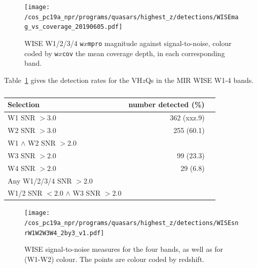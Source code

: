 \documentclass[usenatbib]{mnras}
\begin{document}

\begin{figure}
  \texttt{[image: /cos\_pc19a\_npr/programs/quasars/highest\_z/detections/WISEmag\_vs\_coverage\_20190605.pdf]}
  \centering
  \vspace{-14pt}
  \caption[]{WISE W1/2/3/4 {\tt w$x$mpro} magnitude against signal-to-noise, 
    colour coded by {\tt w$x$cov} the mean coverage depth, in each corresponding band.
  }
  \label{fig:WISEmag_vs_coverage}
\end{figure}

Table~\ref{tab:mir_detection} gives the detection rates for the
VH$z$Qs in the MIR WISE W1-4 bands. 
\begin{table}
  \begin{tabular}{l r l}
    \hline  \hline
    Selection   & number detected (\%) \\
    \hline  
    W1 SNR $> 3.0$                                             &  362  (xxz.9) \\
    W2 SNR $> 3.0$                                            &   255 (60.1) \\
    W1 $\land$ W2 SNR $> 2.0$                         &  \\
    W3 SNR $> 2.0$                                            &  99    (23.3) \\
    W4 SNR $> 2.0$                                            &  29    (6.8) \\
    Any W1/2/3/4 SNR $>2.0$                           & \\
    W1/2 SNR $< 2.0$ $\land$ W3 SNR $>2.0$ & \\
    \hline  \hline
  \end{tabular}
  \caption{}
  \label{tab:mir_detection}
\end{table}

\begin{figure}
  \texttt{[image: /cos\_pc19a\_npr/programs/quasars/highest\_z/detections/WISEsnrW1W2W3W4\_2by3\_v1.pdf]}
  \centering
  \vspace{-14pt}
  \caption[]{WISE signal-to-noise measures for the four bands, as well
    as for (W1-W2) colour.  The points are colour coded by redshift.}
  \label{fig:WISEmag_vs_coverage}
\end{figure}
\end{document}
